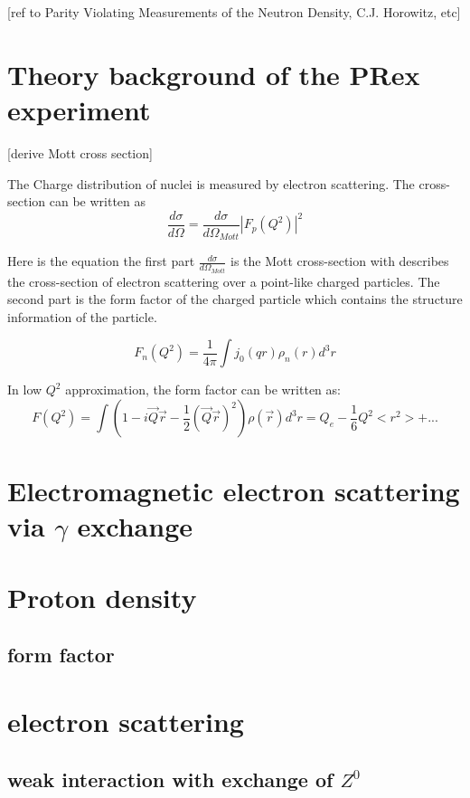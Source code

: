 [ref to Parity Violating Measurements of the Neutron Density, C.J. Horowitz, etc]

\section{Theory background of the PRex experiment}
[derive Mott cross section]


The Charge distribution of nuclei is measured by electron scattering. The cross-section can be written as
\begin{equation}
    \frac{d\sigma}{d\Omega} = \frac{d\sigma}{d\Omega_{Mott}}|F_p(Q^2)|^2
\end{equation}

Here is the equation the first part $\frac{d\sigma}{d\Omega_{Mott}}$ is the Mott cross-section with describes the cross-section of electron scattering over a point-like charged particles. The second part is the form factor of the charged particle which contains the structure information of the particle. 


\begin{equation}
    F_n(Q^2) = \frac{1}{4\pi}\int{j_0(qr)\rho_n(r)}d^3r
\end{equation}

In low $Q^2$ approximation, the form factor can be written as:
\begin{equation}
    F(Q^2) = \int{(1-i\Vec{Q}\Vec{r} - \frac{1}{2}(\Vec{Q}\Vec{r})^2)\rho(\Vec{r})}d^3r = Q_e - \frac{1}{6}Q^2<r^2> + ...
\end{equation}


\section{Electromagnetic electron scattering via $\gamma$ exchange}
\section{Proton density}
\subsection{form factor}
\section{electron scattering} 
\subsection{weak interaction with exchange of $Z^0$}


